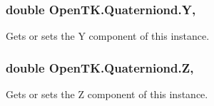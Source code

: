 \hypertarget{struct_open_t_k_1_1_quaterniond_ad1e8a8564cc57374f5db3569238b2a77}{
\subsubsection[{Y}]{\setlength{\rightskip}{0pt plus 5cm}double Open\-T\-K.\-Quaterniond.\-Y\hspace{0.3cm}{\ttfamily [get]}, {\ttfamily [set]}}}\label{struct_open_t_k_1_1_quaterniond_ad1e8a8564cc57374f5db3569238b2a77}


Gets or sets the Y component of this instance. 

\hypertarget{struct_open_t_k_1_1_quaterniond_a5dfcea3ee6e2541d0539ec4947a8677c}{
\subsubsection[{Z}]{\setlength{\rightskip}{0pt plus 5cm}double Open\-T\-K.\-Quaterniond.\-Z\hspace{0.3cm}{\ttfamily [get]}, {\ttfamily [set]}}}\label{struct_open_t_k_1_1_quaterniond_a5dfcea3ee6e2541d0539ec4947a8677c}


Gets or sets the Z component of this instance. 

